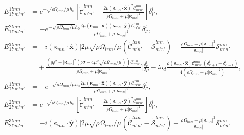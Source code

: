 \documentclass[aps,pre,amsmath,amssymb,floatfix,onecolumn,notitlepage,10pt]{revtex4-1}
\begin{document}
\begin{align}
E_{1l'm'n'}^{1lmn} &= e^ {-\sqrt{{\rho  \Omega _{l m n}}/{\mu }}h_0}\left[ \tilde{\mathcal{C}}_{m' n'}^{l m n}-\frac{2 \mu  \left( \bm{\kappa}_{mn}\cdot\hat{\mathbf{x}} \right)^2 \mathcal{C}_{m' n'}^{m n}}{\rho  \Omega _{l m n}+\mu  \left\lvert \bm{\kappa}_{m n} \right\rvert^2}\right] \delta^l_{l'}, \\
E_{1l'm'n'}^{2lmn} &=-e^ {-\sqrt{{\rho  \Omega _{l m n}}/{\mu }}h_0}\frac{2 \mu  \left( \bm{\kappa}_{mn}\cdot\hat{\mathbf{x}} \right) \left( \bm{\kappa}_{mn}\cdot\hat{\mathbf{y}} \right) \mathcal{C}_{m' n'}^{m n}}{\rho  \Omega _{l m n}+\mu  \left\lvert \bm{\kappa}_{m n} \right\rvert^2} \delta^l_{l'},  \\
E_{1l'm'n'}^{3lmn} &=-i \left( \bm{\kappa}_{mn}\cdot\hat{\mathbf{x}} \right) \Bigg[2 \mu  \sqrt{{\rho  \Omega _{l m n}}/{\mu }} \left(\tilde{\mathcal{C}}_{m' n'}^{l m n}-\tilde{\mathcal{S}}_{m' n'}^{l m n}\right)+\frac{\rho  \Omega _{l m n} +  \mu \left\lvert \bm{\kappa}_{m n} \right\rvert^2}{\left\lvert \bm{\kappa}_{m n} \right\rvert} \mathcal{S}_{m' n'}^{m n} \nonumber \\
&\quad + \frac{\left(g \rho ^2+\left\lvert \bm{\kappa}_{m n} \right\rvert^2 \left(\rho  \sigma -4 \mu ^2 \sqrt{{\rho  \Omega _{l m n}}/{\mu }}\right)\right)\mathcal{C}_{m' n'}^{m n}}{\rho  \Omega _{l m n}+\mu  \left\lvert \bm{\kappa}_{m n} \right\rvert^2}\Bigg] \frac{\delta^l_{l'}}{2\rho} - i a_d \frac{\rho\left( \bm{\kappa}_{mn}\cdot\hat{\mathbf{x}} \right) \mathcal{C}_{m' n'}^{m n} \left(\delta^l_{l'+1}+\delta^l_{l'-1}\right)}{4\left(\rho  \Omega _{l m n}+\mu  \left\lvert \bm{\kappa}_{m n} \right\rvert^2\right)},  \\
E_{2l'm'n'}^{1lmn} &= -e^ {-\sqrt{{\rho  \Omega _{l m n}}/{\mu }}h_0}\frac{2 \mu  \left( \bm{\kappa}_{mn}\cdot\hat{\mathbf{x}} \right) \left( \bm{\kappa}_{mn}\cdot\hat{\mathbf{y}} \right) \mathcal{C}_{m' n'}^{m n}}{\rho  \Omega _{l m n}+\mu  \left\lvert \bm{\kappa}_{m n} \right\rvert^2} \delta^l_{l'}, \\
E_{2l'm'n'}^{2lmn} &=e^ {-\sqrt{{\rho  \Omega _{l m n}}/{\mu }}h_0}\left[\tilde{\mathcal{C}}_{m' n'}^{l m n}-\frac{2 \mu  \left( \bm{\kappa}_{mn}\cdot\hat{\mathbf{y}} \right)^2 \mathcal{C}_{m' n'}^{m n}}{\rho  \Omega _{l m n}+\mu  \left\lvert \bm{\kappa}_{m n} \right\rvert^2}\right] \delta^l_{l'}, \\
E_{2l'm'n'}^{3lmn} &= -i \left( \bm{\kappa}_{mn}\cdot\hat{\mathbf{y}} \right)  \Bigg[2 \mu  \sqrt{{\rho  \Omega _{l m n}}/{\mu }} \left(\tilde{\mathcal{C}}_{m' n'}^{l m n}-\tilde{\mathcal{S}}_{m' n'}^{l m n}\right)+\frac{ \rho  \Omega _{l m n} +  \mu \left\lvert \bm{\kappa}_{m n} \right\rvert^2 }{\left\lvert \bm{\kappa}_{m n} \right\rvert}\mathcal{S}_{m' n'}^{m n} \nonumber \\

\end{align}
\end{document}
